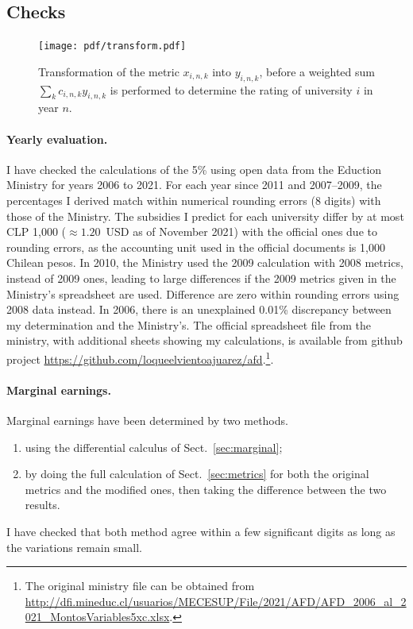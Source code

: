 \documentclass[twocolumn]{article}
\begin{document}
\subsection{Checks}
\begin{figure}
\centering
\texttt{[image: pdf/transform.pdf]}
\caption{Transformation of the metric $x_{i,n,k}$ into $y_{i,n,k}$, before a weighted sum 
$\sum_k c_{i,n,k} y_{i,n,k}$ is performed to determine the rating of university $i$ in year $n$.}
\label{fig:transform}
\end{figure}

\paragraph{Yearly evaluation.} I have checked the calculations of the 5\% using open data from the Eduction Ministry for years 2006 to 2021. For each year since 2011 and 2007--2009, the percentages I
derived match within numerical rounding errors (8 digits) with those of the Ministry. The subsidies I predict for each university differ by at most CLP 1,000 ($\approx 1.20$~USD as of November 2021) with the official ones due to rounding errors, as the accounting unit used in the
official documents is 1,000 Chilean pesos. In 2010, the Ministry used the 2009
calculation with 2008 metrics, instead of 2009 ones, leading to large differences if the 2009 metrics given in the Ministry's spreadsheet are used.  Difference are zero within rounding errors using 2008 data instead. In 2006, there is an unexplained 0.01\% discrepancy between my determination and the Ministry's.  The official spreadsheet file from the ministry, with additional sheets showing my calculations, is available from github project \url{https://github.com/loqueelvientoajuarez/afd}.\footnote{The original ministry file can
be obtained from \url{http://dfi.mineduc.cl/usuarios/MECESUP/File/2021/AFD/AFD_2006_al_2021_MontosVariables5xc.xlsx}.}. 

\paragraph{Marginal earnings.}  Marginal earnings have been determined by two methods. 
\begin{enumerate} 
\item using the differential calculus of Sect.~\ref{sec:marginal};
\item by doing the full calculation of Sect.~\ref{sec:metrics} for both the original metrics and the modified ones, then taking the difference between the two results.
\end{enumerate}
I have checked that both method agree within a few significant digits as long as the variations remain small.
\end{document}
